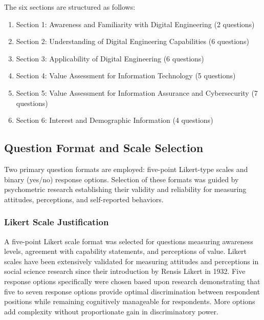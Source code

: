 The six sections are structured as follows:

\begin{enumerate}
  \item Section 1: Awareness and Familiarity with Digital Engineering (2 questions)
  \item Section 2: Understanding of Digital Engineering Capabilities (6 questions)
  \item Section 3: Applicability of Digital Engineering (6 questions)
  \item Section 4: Value Assessment for Information Technology (5 questions)
  \item Section 5: Value Assessment for Information Assurance and Cybersecurity (7 questions)
  \item Section 6: Interest and Demographic Information (4 questions)
\end{enumerate}

\subsection{Question Format and Scale Selection}

Two primary question formats are employed: five-point Likert-type scales and binary (yes/no) response options. Selection of these formats was guided by psychometric research establishing their validity and reliability for measuring attitudes, perceptions, and self-reported behaviors.

\subsubsection{Likert Scale Justification}

A five-point Likert scale format was selected for questions measuring awareness levels, agreement with capability statements, and perceptions of value. Likert scales have been extensively validated for measuring attitudes and perceptions in social science research since their introduction by Rensis Likert in 1932. Five response options specifically were chosen based upon research demonstrating that five to seven response options provide optimal discrimination between respondent positions while remaining cognitively manageable for respondents. More options add complexity without proportionate gain in discriminatory power.

